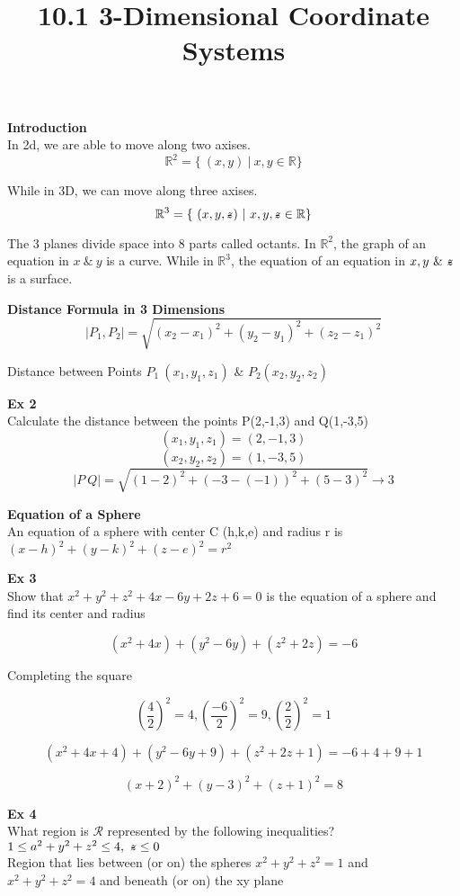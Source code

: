 \documentclass{article}
\title{10.1 3-Dimensional Coordinate Systems}
\begin{document}
  \maketitle
  \textbf{Introduction}\\
  In 2d, we are able to move along two axises.
  \[
    \mathbb{R}^2=\{~(x,y)~|~x,y \in \mathbb{R}\}
  \]

  While in 3D, we can move along three axises.
  \[
    \mathbb{R}^3=\{~(x,y, \zstroke)~|~x,y, \zstroke \in \mathbb{R}\}
  \]

  The 3 planes divide space into 8 parts called octants. In $\mathbb{R}^2$, the graph of an equation in $ x ~\&~y $  is a curve. While in $\mathbb{R}^3$, the equation of an equation in $ x,y ~ \&~ \zstroke$  is a surface. 

  \textbf{Distance Formula in 3 Dimensions}
  \[
    |P_1, P_2| = \sqrt{(x_2-x_1)^2+(y_2-y_1)^2 + (z_2-z_1)^2}
  \]

  \begin{center}
  Distance between Points $P_1 ~ (x_1,y_1,z_1)$ \& $P_2(x_2,y_2,z_2)$
  \end{center}

  \textbf{Ex 2}\\
  Calculate the distance between the points P(2,-1,3) and Q(1,-3,5)
  \[
    (x_1,y_1,z_1)=(2,-1,3)
  \]
  \[
    (x_2,y_2,z_2)=(1,-3,5)
  \]
  \[
    |P~Q| = \sqrt{(1-2)^2+(-3-(-1))^2 + (5-3)^2}\to 3
  \]

  \textbf{Equation of a Sphere}\\
  An equation of a sphere with center C (h,k,e) and radius r is $(x-h)^2 + (y-k)^2 + (z-e)^2 = r^2$

  \textbf{Ex 3}\\
  Show that $x^2+y^2+z^2+4x-6y+2z+6=0$ is the equation of a sphere and find its center and radius

  \[
    (x^2+4x)+(y^2-6y)+(z^2+2z)=-6
  \]

  \begin{center}
    Completing the square
  \end{center}
  \[
    (\frac{4}{2})^2=4, (\frac{-6}{2})^2=9, (\frac{2}{2})^2=1
  \]

  \[
    (x^2+4x+4)+(y^2-6y+9)+(z^2+2z+1)=-6+4+9+1
  \]
  
  \[
    (x+2)^2 + (y-3)^2 + (z+1)^2=8
  \]
  
  \textbf{Ex 4}\\
  What region is $ \mathcal{R} $ represented by the following inequalities?\\
  $ 1 \le a^2 + y^2 + z^2 \le 4,~ \zstroke \le0 $\\
  Region that lies between (or on) the spheres $x^2+y^2+z^2=1$ and $x^2+y^2+z^2=4$ and beneath (or on) the xy plane
\end{document}
